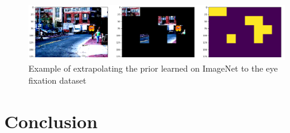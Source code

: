 \documentclass[10pt,twocolumn,letterpaper]{article}
\begin{document}
\begin{figure}
	\begin{center}
		\includegraphics[width=\columnwidth]{figures/road.png}		
	\end{center}
	\caption{Example of extrapolating the prior learned on ImageNet to the eye fixation dataset}
	\label{fig:short}
\end{figure}


\section{Conclusion}

{\small


}
\end{document}
